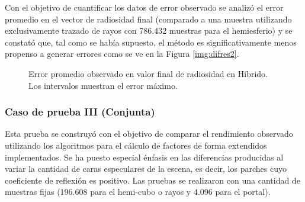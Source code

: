 Con el objetivo de cuantificar los datos de error observado se analizó el error promedio en el vector de radiosidad final (comparado a una muestra utilizando exclusivamente trazado de rayos con 786.432 muestras para el hemiesferio) y se constató que, tal como se había supuesto, el método es significativamente menos propenso a generar errores como se ve en la Figura \ref{img:difres2}.

\begin{figure}
\caption{Error promedio observado en valor final de radiosidad en Híbrido. Los intervalos muestran el error máximo.}
\label{plot:errorcII}
\end{figure}
\subsubsection{Caso de prueba III (Conjunta)}

Esta prueba se construyó con el objetivo de comparar el rendimiento observado utilizando los algoritmos para el cálculo de factores de forma extendidos implementados. Se ha puesto especial énfasis en las diferencias producidas al variar la cantidad de caras especulares de la escena, es decir, los parches cuyo coeficiente de reflexión es positivo. Las pruebas se realizaron con una cantidad de muestras fijas (196.608 para el hemi-cubo o rayos y 4.096 para el portal).

